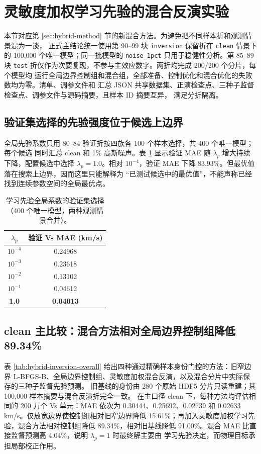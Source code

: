 \documentclass[UTF8,a4paper,11pt]{ctexart}
\begin{document}
\section{灵敏度加权学习先验的混合反演实验}\label{sec:hybrid}

本节对应第 \ref{sec:hybrid-method} 节的新混合方法。为避免把不同样本折和观测情景混为一谈，
正式主结论统一使用第 90--99 块 \texttt{inversion} 保留折在 \texttt{clean} 情景下的
100{,}000 个唯一模型；同一批模型的 \texttt{noise\_1pct} 只用于稳健性分析。第 85--89 块
\texttt{test} 折仅作为次要复现，不参与主效应数字。两折均完成 200/200 个分片，每个模型均
运行全局边界控制组和混合组，全部准备、控制优化和混合优化的失败数均为零。清单、调参文件和
汇总 JSON 共享数据集、正演检查点、三种子监督检查点、调参文件与源码摘要，且样本 ID 摘要互异，
满足分折隔离。

\subsection{验证集选择的先验强度位于候选上边界}

全局先验系数只用 80--84 验证折按四族各 100 个样本选择，共 400 个唯一模型；每个候选
同时汇总 clean 和 1\% 高斯噪声。表 \ref{tab:hybrid-tuning} 显示验证 MAE 随
\(\lambda_p\) 增大持续下降，配置候选中选择 \(\lambda_p=1.0\)。相对
\(10^{-4}\)，验证 MAE 下降 83.93\%。但最优值落在搜索上边界，因而这里只能解释为
``已测试候选中的最优值''，不能声称已经找到连续参数空间的全局最优点。

\begin{table}[H]
\centering
\caption{学习先验全局系数的验证集选择（400 个唯一模型，两种观测情景合并）。}
\label{tab:hybrid-tuning}
\begin{tabular}{cc}
\toprule
\(\lambda_p\) & 验证 Vs MAE (km/s) \\
\midrule
\(10^{-4}\) & 0.24968 \\
\(10^{-3}\) & 0.23618 \\
\(10^{-2}\) & 0.13102 \\
\(10^{-1}\) & 0.04612 \\
\textbf{1.0} & \textbf{0.04013} \\
\bottomrule
\end{tabular}
\end{table}

\subsection{clean 主比较：混合方法相对全局边界控制组降低 89.34\%}

表 \ref{tab:hybrid-inversion-overall} 给出四种通过精确样本身份门控的方法：旧窄边界
L-BFGS-B、全局边界控制组、灵敏度加权混合反演，以及混合分片中实际保存的三种子监督先验预测。
旧基线的身份由 280 个原始 HDF5 分片只读重建；其 100{,}000 样本摘要与混合反演折完全一致。
在主口径 clean 下，每种方法均评估相同的 200 万个 Vs 单元：MAE 依次为
0.30444、0.25692、0.02739 和 0.02633 km/s。仅放宽边界使控制组相对旧窄边界降低
15.61\%；再加入灵敏度加权学习先验，混合方法相对控制组降低 89.34\%，相对旧基线降低
91.00\%。混合 MAE 比直接监督预测高 4.04\%，说明 \(\lambda_p=1\) 时最终解主要由
学习先验决定，而物理目标承担局部校正作用。
\end{document}
